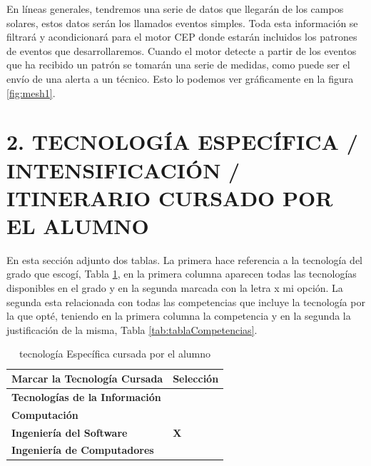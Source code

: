 \documentclass[a4paper]{article}
\begin{document}
En líneas generales, tendremos una serie de datos que llegarán de los campos solares, estos datos serán los llamados eventos simples. Toda esta información se filtrará y acondicionará para el motor CEP donde estarán incluidos los patrones de eventos que desarrollaremos. Cuando el motor detecte a partir de los eventos que ha recibido un patrón se tomarán una serie de medidas, como puede ser el envío de una alerta a un técnico. Esto lo podemos ver gráficamente en la figura \ref{fig:mesh1}.

\section{2. TECNOLOG\'IA ESPEC\'IFICA / INTENSIFICACIÓN / ITINERARIO CURSADO POR EL ALUMNO}

\bigskip
En esta sección adjunto dos tablas. La primera hace referencia a la tecnología del grado que escogí, Tabla \ref{tab:tablaTecnologia}, en la primera columna aparecen todas las tecnologías disponibles en el grado y en la segunda marcada con la letra x mi opción. La segunda esta relacionada con todas las competencias que incluye la tecnología por la que opté, teniendo en la primera columna la competencia y en la segunda la justificación de la misma, Tabla \ref{tab:tablaCompetencias}.

\clearpage\pagestyle{plain}

\begin{longtable}{m{6.803cm} m{2.605cm}}
    \caption{tecnolog\'ia Espec\'ifica cursada por el alumno}
    \label{tab:tablaTecnologia}
    \endfirsthead
	\endhead

    \rowcolor{gray!50}
	{\color{black} \textbf{Marcar la Tecnolog\'ia Cursada}} &
	{\color{black} \textbf{Selección}}\\\hline
	
    {\color{black} \textbf{Tecnolog\'ias de la Informaci\'on}} &
    {\color{black} \textbf{}}\\\hline
	\rowcolor{gray!30}
    {\color{black} \textbf{Computaci\'on}}&
    {\color{black} \textbf{}}\\\hline
	
    {\color{black} \textbf{Ingenier\'ia del Software}}&
    {\color{black} \textbf{X}}\\\hline
	\rowcolor{gray!30}

	{\color{black} \textbf{Ingenier\'ia de Computadores}}&
    {\color{black} \textbf{}}\\\hline
\end{longtable}
\end{document}
